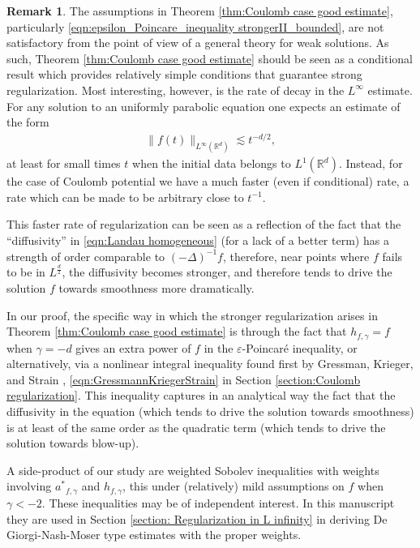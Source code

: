 \documentclass[12pt,american]{amsart}
\numberwithin{equation}{section}
\theoremstyle{plain}
\theoremstyle{definition}                  %
\newtheorem{rem}[thm]{Remark}
\def\astar{{a^*}}
\begin{document}
\begin{rem}\label{rem:Coulomb case good estimate discussion} The assumptions in Theorem \ref{thm:Coulomb case good estimate}, particularly \eqref{eqn:epsilon_Poincare_inequality strongerII_bounded}, are not satisfactory from the point of view of a general theory for weak solutions. As such, Theorem \ref{thm:Coulomb case good estimate} should be seen as a conditional result which provides relatively simple conditions that guarantee strong regularization. Most interesting, however, is the rate of decay in the $L^\infty$ estimate. For any solution to an uniformly parabolic equation one expects an estimate of the form 
  \begin{align*}	
    \|f(t)\|_{L^\infty(\mathbb{R}^d)} \lesssim t^{-d/2},	
  \end{align*}
  at least for small times $t$ when the initial data belongs to $L^1(\mathbb{R}^d)$. Instead, for the case of Coulomb potential we have a much faster (even if conditional) rate, a rate which can be made to be  arbitrary close to $t^{-1}$. 
  
  This faster rate of regularization can be seen as a reflection of the fact that the ``diffusivity'' in \eqref{eqn:Landau homogeneous} (for a lack of a better term) has a strength of order comparable to $(-\Delta)^{-1}f$, therefore, near points where $f$ fails to be in $L^{\frac{d}{2}}$, the diffusivity becomes stronger, and therefore tends to drive the solution $f$ towards smoothness more dramatically. 
  
  In our proof, the specific way in which the stronger regularization arises in Theorem \ref{thm:Coulomb case good estimate} is through the fact that $h_{f,\gamma}=f$ when $\gamma=-d$ gives an extra power of $f$ in the $\varepsilon$-Poincar\'e inequality, or alternatively, via a nonlinear integral inequality found first by Gressman, Krieger, and Strain \cite{GreKriStr2012}, \eqref{eqn:GressmannKriegerStrain} in Section \ref{section:Coulomb regularization}. This inequality captures in an analytical way the fact that the diffusivity in the equation (which tends to drive the solution towards smoothness) is at least of the same order as the quadratic term (which tends to drive the solution towards blow-up).

\end{rem}
  
A side-product of our study are weighted Sobolev inequalities with weights involving $\astar_{f,\gamma}$ and $h_{f,\gamma}$, this under (relatively) mild assumptions on $f$ when $\gamma <-2$. These inequalities may be of independent interest. In this manuscript they are used in Section \ref{section: Regularization in L infinity} in deriving De Giorgi-Nash-Moser type estimates with the proper weights.
\end{document}

